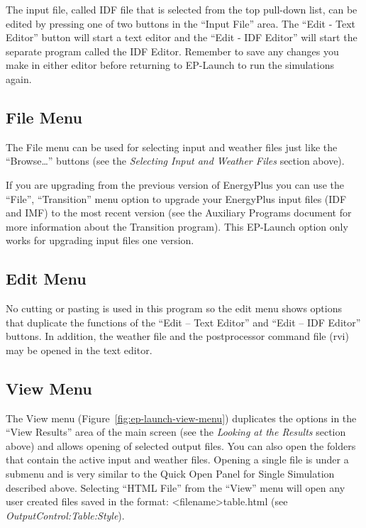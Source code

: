 The input file, called IDF file that is selected from the top pull-down list, can be edited by pressing one of two buttons in the ``Input File'' area. The ``Edit - Text Editor'' button will start a text editor and the ``Edit - IDF Editor'' will start the separate program called the IDF Editor. Remember to save any changes you make in either editor before returning to EP-Launch to run the simulations again.

\subsection{File Menu}\label{file-menu}

The File menu can be used for selecting input and weather files just like the ``Browse\ldots{}'' buttons (see the \emph{Selecting Input and Weather Files} section above).

If you are upgrading from the previous version of EnergyPlus you can use the ``File'', ``Transition'' menu option to upgrade your EnergyPlus input files (IDF and IMF) to the most recent version (see the Auxiliary Programs document for more information about the Transition program). This EP-Launch option only works for upgrading input files one version.

\subsection{Edit Menu}\label{edit-menu}

No cutting or pasting is used in this program so the edit menu shows options that duplicate the functions of the ``Edit -- Text Editor'' and ``Edit -- IDF Editor'' buttons. In addition, the weather file and the postprocessor command file (rvi) may be opened in the text editor.

\subsection{View Menu}\label{view-menu}

The View menu (Figure~\ref{fig:ep-launch-view-menu}) duplicates the options in the ``View Results'' area of the main screen (see the \emph{Looking at the Results} section above) and allows opening of selected output files. You can also open the folders that contain the active input and weather files. Opening a single file is under a submenu and is very similar to the Quick Open Panel for Single Simulation described above. Selecting ``HTML File'' from the ``View'' menu will open any user created files saved in the format: \textless{}filename\textgreater{}table.html (see \emph{OutputControl:Table:Style}).

